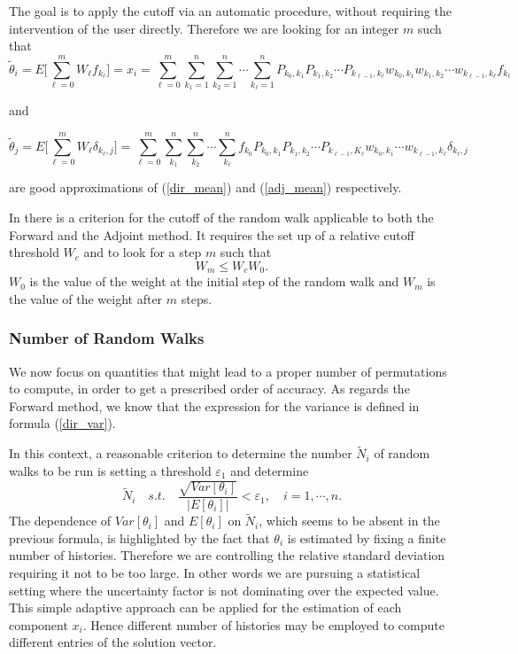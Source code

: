 The goal is to apply the cutoff via an automatic procedure, without requiring
the intervention of the user directly.
Therefore we are looking for an integer $m$ such that
\[
\tilde{\theta}_i=E\bigg[\sum_{\ell=0}^m W_{\ell}
f_{k_{\ell}}\bigg]=x_i=\sum_{\ell=0}^m
\sum_{k_1=1}^{n}\sum_{k_2=1}^n\cdots \sum_{k_{\ell}=1}^n
P_{k_0,k_1}P_{k_1,k_2}\cdots P_{k_{\ell-1},
k_{\ell}}w_{k_0,k_1}w_{k_1,k_2}\cdots
w_{k_{\ell-1}, k_{\ell}}f_{k_{\ell}}
\]

and

\[
\tilde{\theta}_j=E\bigg[\sum_{\ell=0}^m W_{\ell}\delta_{k_{\ell},
j}\bigg]=\sum_{\ell=0}^{m}\sum_{k_1}^n\sum_{k_2}^n\cdots\sum_{k_{\ell}}^n
f_{k_0}P_{k_0,k_1}P_{k_1,k_2}\cdots P_{k_{\ell-1},K_{\ell}}w_{k_0,k_1}\cdots
w_{k_{\ell-1},k_{\ell}}\delta_{k_{\ell},j}
\]

are good approximations of (\ref{dir_mean}) and (\ref{adj_mean}) respectively.


In \cite{Slattery2013} there is a criterion for the cutoff of the random walk
applicable to both the Forward and the Adjoint method. It requires the set up
of a relative cutoff threshold $W_c$ and to look for a step $m$ such that
\begin{equation}
W_m \le W_c W_0.
\label{cutoff}
\end{equation}
$W_0$ is the value of the weight at the initial step of the random walk and
$W_m$ is the value of the weight after $m$ steps.

\subsubsection{Number of Random Walks}

We now focus on quantities that might lead to a proper
number of permutations to compute, in order to get a prescribed order of
accuracy.
As regards the Forward method, we know that the expression for the variance
is defined in formula (\ref{dir_var}).

In this context, a reasonable criterion to determine the number $\tilde{N}_i$
of random walks to be run is setting a threshold $\varepsilon_1$ and determine
\begin{equation}
\tilde{N}_i \quad s.t.\quad \frac{\sqrt{Var[\theta_i]}}{\lvert
E[\theta_i]\rvert}<\varepsilon_1, \quad i=1,\cdots,n.
\label{forward_adapt}
\end{equation}
The dependence of $Var[\theta_i]$ and $E[\theta_i]$ on $\tilde{N}_i$, which
seems
to be absent in the previous formula, is highlighted by the fact that
$\theta_i$
is estimated by fixing a finite number of histories.
Therefore we are controlling the relative standard deviation requiring it not
to be too large. In other words we are pursuing a statistical setting where the
uncertainty factor is not dominating over the expected value.
This simple adaptive approach can be applied for the estimation of each
component $x_i$. Hence different number of histories may be employed to
compute different entries of the solution vector. \newline


